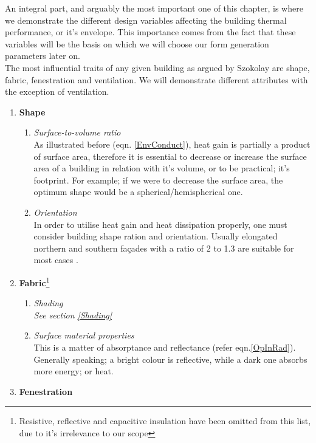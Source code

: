 An integral part, and arguably the most important one of this chapter, is where we demonstrate the different design variables affecting the building thermal performance, or it's envelope. This importance comes from the fact that these variables will be the basis on which we will choose our form generation parameters later on.\\ The most influential traits of any given building as argued by Szokolay \cite{szokolay08} are shape, fabric, fenestration and ventilation. We will demonstrate different attributes with the exception of ventilation.\\ \vspace{0.5cm} \label{ThermDesVar}
\begin{enumerate}
  \item \textbf{Shape}
  	\begin{enumerate}
    	\item \emph{Surface-to-volume ratio}\\ As illustrated before (eqn. \ref{EnvConduct}), heat gain is partially a product of surface area, therefore it is essential to decrease or increase the surface area of a building in relation with it's volume, or to be practical; it's footprint.  For example; if we were to decrease the surface area, the optimum shape would be a spherical/hemispherical one. 
    	\item \emph{Orientation}\\ In order to utilise heat gain and heat dissipation properly, one
    	must consider building shape ration and orientation. Usually elongated northern and southern
    	fa\c{c}ades with a ratio of 2 to 1.3 are suitable for most cases \cite{szokolay08}.
  	\end{enumerate}
  \item \textbf{Fabric}\footnote{Resistive, reflective and capacitive insulation have been omitted from this list, due to it's irrelevance to our scope}
  	\begin{enumerate}
    	\item \emph{Shading}\\ \emph{See section \ref{Shading}}
    	\item \emph{Surface material properties}\\ This is a matter of absorptance and reflectance (refer eqn.\ref{OpInRad}). Generally speaking; a bright colour is reflective, while a dark one absorbs more energy; or heat.
  \end{enumerate}
  \item \textbf{Fenestration}

\end{enumerate}
